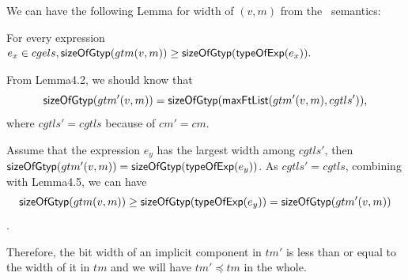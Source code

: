{We can have the following Lemma for width of $(v,m)$ from the \typecompatible \ semantics:

\begin{lemma}
For every expression $e_x \in cgels, {\sf sizeOfGtyp}(gtm(v,m)) \geq {\sf sizeOfGtyp}({\sf typeOfExp}(e_x)).$
\end{lemma}   

    



From Lemma4.2, we should know that $${\sf sizeOfGtyp}(gtm'(v,m)) = {\sf sizeOfGtyp}({\sf maxFtList}(gtm'(v,m),cgtls')),$$ where $cgtls' = cgtls$ because of $cm' = cm$.

Assume that the expression $e_y$ has the largest width among $cgtls'$, then ${\sf sizeOfGtyp}(gtm'(v,m)) = {\sf sizeOfGtyp}({\sf typeOfExp}(e_y))$. As $cgtls' = cgtls$, combining with Lemma4.5, we can have $${\sf sizeOfGtyp}(gtm(v,m)) \geq {\sf sizeOfGtyp}({\sf typeOfExp}(e_y)) = {\sf sizeOfGtyp}(gtm'(v,m))$$.

Therefore, the bit width of an implicit component in $tm'$ is less than or equal to the width of it in $tm$ and we will have $tm' \preceq tm$ in the whole.

    
}
